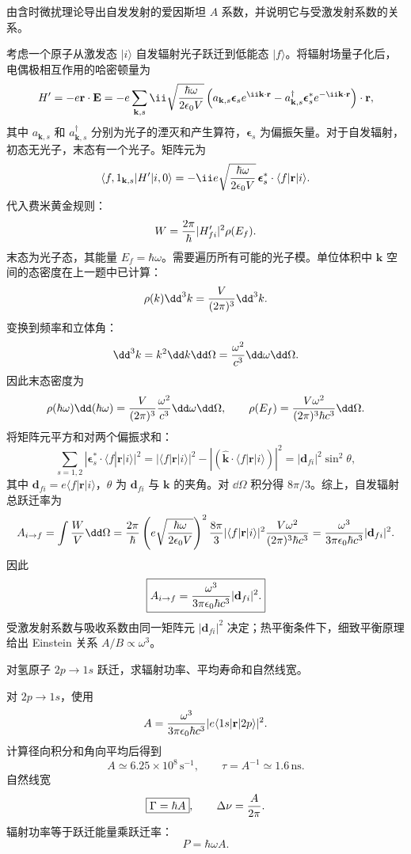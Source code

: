 \begin{question}
由含时微扰理论导出自发发射的爱因斯坦 $A$ 系数，并说明它与受激发射系数的关系。
\end{question}
\begin{solution}
考虑一个原子从激发态 $|i\rangle$ 自发辐射光子跃迁到低能态 $|f\rangle$。将辐射场量子化后，电偶极相互作用的哈密顿量为
\[
H'=-e\mathbf r\cdot\mathbf E=-e\sum_{\mathbf k,s}\ii\sqrt{\hbar\omega\over2\epsilon_0 V}
\left(a_{\mathbf k,s}\boldsymbol\epsilon_se^{\ii\mathbf k\cdot\mathbf r}-a^\dagger_{\mathbf k,s}\boldsymbol\epsilon_s^* e^{-\ii\mathbf k\cdot\mathbf r}\right)\cdot\mathbf r,
\]
其中 $a_{\mathbf k,s}$ 和 $a^\dagger_{\mathbf k,s}$ 分别为光子的湮灭和产生算符，$\boldsymbol\epsilon_s$ 为偏振矢量。对于自发辐射，初态无光子，末态有一个光子。矩阵元为
\[
\langle f,1_{\mathbf k,s}|H'|i,0\rangle
=-\ii e\sqrt{\hbar\omega\over2\epsilon_0 V}\,\boldsymbol\epsilon_s^*\cdot\langle f|\mathbf r|i\rangle.
\]
代入费米黄金规则：
\[
W={2\pi\over\hbar}|H'_{fi}|^2\rho(E_f).
\]
末态为光子态，其能量 $E_f=\hbar\omega$。需要遍历所有可能的光子模。单位体积中 $\mathbf k$ 空间的态密度在上一题中已计算：
\[
\rho(k)\dd^3k={V\over(2\pi)^3}\dd^3k.
\]
变换到频率和立体角：
\[
\dd^3k=k^2\dd k\dd\Omega={\omega^2\over c^3}\dd\omega\dd\Omega.
\]
因此末态密度为
\[
\rho(\hbar\omega)\dd(\hbar\omega)={V\over(2\pi)^3}{\omega^2\over c^3}\dd\omega\dd\Omega,
\qquad
\rho(E_f)={V\omega^2\over(2\pi)^3\hbar c^3}\dd\Omega.
\]
将矩阵元平方和对两个偏振求和：
\[
\sum_{s=1,2}|\boldsymbol\epsilon_s^*\cdot\langle f|\mathbf r|i\rangle|^2
=|\langle f|\mathbf r|i\rangle|^2-|(\hat{\mathbf k}\cdot\langle f|\mathbf r|i\rangle)|^2
=|\mathbf d_{fi}|^2\sin^2\theta,
\]
其中 $\mathbf d_{fi}=e\langle f|\mathbf r|i\rangle$，$\theta$ 为 $\mathbf d_{fi}$ 与 $\mathbf k$ 的夹角。对 $\dd\Omega$ 积分得 $8\pi/3$。综上，自发辐射总跃迁率为
\[
A_{i\to f}=\int{W\over V}\dd\Omega
={2\pi\over\hbar}\left(e\sqrt{\hbar\omega\over2\epsilon_0 V}\right)^2
{8\pi\over3}|\langle f|\mathbf r|i\rangle|^2{V\omega^2\over(2\pi)^3\hbar c^3}
={\omega^3\over3\pi\epsilon_0\hbar c^3}|\mathbf d_{fi}|^2.
\]
因此
\[
\boxed{A_{i\to f}={\omega^3\over3\pi\epsilon_0\hbar c^3}|\mathbf d_{fi}|^2.}
\]
受激发射系数与吸收系数由同一矩阵元 $|\mathbf d_{fi}|^2$ 决定；热平衡条件下，细致平衡原理给出 Einstein 关系 $A/B\propto\omega^3$。
\end{solution}

\begin{question}
对氢原子 $2p\to1s$ 跃迁，求辐射功率、平均寿命和自然线宽。
\end{question}
\begin{solution}
对 $2p\to1s$，使用
\[
A={\omega^3\over3\pi\epsilon_0\hbar c^3}|e\langle1s|\mathbf r|2p\rangle|^2.
\]
计算径向积分和角向平均后得到
\[
\boxed{A\simeq6.25\times10^8\,\mathrm{s}^{-1}},\qquad
\boxed{\tau=A^{-1}\simeq1.6\,\mathrm{ns}}.
\]
自然线宽
\[
\boxed{\Gamma=\hbar A},\qquad
\Delta\nu={A\over2\pi}.
\]
辐射功率等于跃迁能量乘跃迁率：
\[
\boxed{P=\hbar\omega A}.
\]
\end{solution}

